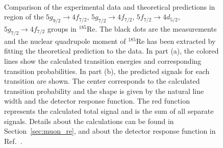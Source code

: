 \begin{figure}%
\centering
{}\\
\caption{
Comparison of the experimental data and theoretical predictions in region of the $5g_{9/2}\rightarrow4f_{7/2}$, $5g_{7/2}\rightarrow4f_{7/2}$, $5f_{7/2}\rightarrow4d_{5/2}$, $5g_{7/2}\rightarrow4f_{7/2}$ groups in $^{185}$Re. The black dots are the measurements and the nuclear quadrupole moment of $^{185}$Re has been extracted by fitting the theoretical prediction to the data. 
In part (a), the colored lines show the calculated transition energies and corresponding transition probabilities.
In part (b), the predicted signals for each transition are shown. The center corresponds to the calculated transition probability and the shape is given by the natural line width and the detector response function. The red function represents the calculated total signal and is the sum of all separate signals. Details about the calculations can be found in Section~\ref{sec:muon_re}, and about the detector response function in Ref.~\cite{vogiatzi2018}.
}
\label{fig:re54}
\end{figure}%
